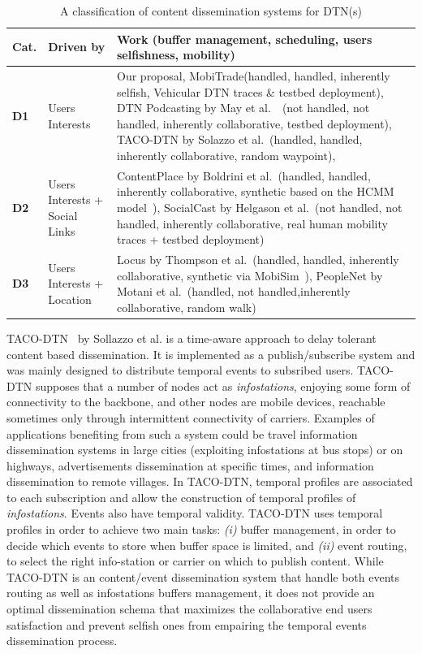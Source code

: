 \begin{table}[!h]
\renewcommand{\arraystretch}{1.1}
\caption{A classification of content dissemination systems for DTN(s)}
\centering
\footnotesize
\begin{tabular}{|p{1cm}|p{2cm}|p{9.5cm}|}
\hline
\bfseries Cat. &\bfseries Driven by&\bfseries Work (buffer management, scheduling, users selfishness, mobility)\\
\hline
\bfseries D1&Users Interests & Our proposal, MobiTrade(handled, handled, inherently selfish, Vehicular DTN traces \& testbed deployment), DTN Podcasting by May et al.~\cite{May07wirelessopportunistic}~\cite{Lenders:Podcast}(not handled, not handled, inherently collaborative, testbed deployment), TACO-DTN by Solazzo et al.~\cite{TACODTN}(handled, handled, inherently collaborative, random waypoint), \\
\hline
\bfseries D2&Users Interests + Social Links &ContentPlace by Boldrini et al.~\cite{Chiara:MSWIM08}(handled, handled, inherently collaborative, synthetic based on the HCMM model~\cite{HCMM}), SocialCast by Helgason et al.~\cite{SocialCast2, SocialCast}(not handled, not handled, inherently collaborative, real human mobility traces + testbed deployment)\\
\hline
\bfseries D3&Users Interests + Location & Locus by Thompson et al.~\cite{LOCUS}(handled, handled, inherently collaborative, synthetic via MobiSim~\cite{MobiSim}), PeopleNet by Motani et al.~\cite{Peoplenet}(handled, not handled,inherently collaborative, random walk)\\
\hline
\end{tabular}
\label{DisseminationSummary}
\end{table}

TACO-DTN~\cite{TACODTN} by Sollazzo et al. is a time-aware approach to delay tolerant content based dissemination. It is implemented as a publish/subscribe system and was mainly designed to distribute temporal events to subsribed users. TACO-DTN supposes that a number of nodes act as \emph{infostations}, enjoying some form of connectivity to the backbone, and other nodes are mobile devices, reachable sometimes only through intermittent connectivity of carriers. Examples of applications benefiting from such a system could be travel information dissemination systems in  large cities (exploiting infostations at bus stops) or on highways, advertisements dissemination at specific times, and information dissemination to remote villages. In TACO-DTN, temporal profiles are associated to each subscription and allow the construction of temporal profiles of \emph{infostations}. Events also have temporal validity. TACO-DTN uses temporal profiles in order to achieve two main tasks: \emph{(i)} buffer management, in order to decide which events to store when buffer space is limited, and \emph{(ii)} event routing, to select the right info-station or carrier on which to publish content. While TACO-DTN is an content/event dissemination system that handle both events routing as well as infostations buffers management, it does not provide an optimal dissemination schema that maximizes the collaborative end users satisfaction and prevent selfish ones from empairing the temporal events dissemination process.


